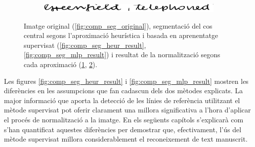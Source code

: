 \begin{figure}
\begin{subfigure}[b]{0.45\textwidth}
\caption{}\label{fig:comp_seg_heur_norm}
\end{subfigure}
~
\begin{subfigure}[b]{0.45\textwidth}
\centering
\includegraphics[width=\textwidth]{images/comp_seg_mlp_norm.eps}
\caption{}\label{fig:comp_seg_mlp_norm}
\end{subfigure}
\caption{Imatge original (\ref{fig:comp_seg_original}), segmentació del cos central segons l'aproximació heurística i basada en aprenentatge supervisat (\ref{fig:comp_seg_heur_result}, \ref{fig:comp_seg_mlp_result}) i resultat de la normalització segons cada aproximació (\ref{fig:comp_seg_heur_norm}, \ref{fig:comp_seg_mlp_norm}).}\label{fig:comp_seg}
\end{figure}

Les figures \ref{fig:comp_seg_heur_result} i \ref{fig:comp_seg_mlp_result} mostren les diferències en les assumpcions que fan cadascun dels dos mètodes explicats. La major informació que aporta la detecció de les línies de referència utilitzant el mètode supervisat pot oferir clarament una millora significativa a l'hora d'aplicar el procés de normalització a la imatge. En els següents capítols s'explicarà com s'han quantificat aquestes diferències per demostrar que, efectivament, l'ús del mètode supervisat millora considerablement el reconeixement de text manuscrit.